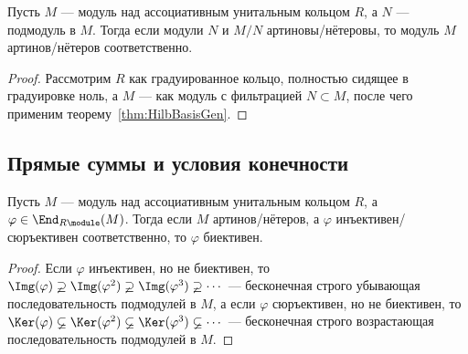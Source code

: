 \documentclass[
	extrafontsizes,
	11pt,
	hyphens,
]{memoir}
\begin{document}
\begin{theorem}
Пусть \(M\) --- модуль над ассоциативным унитальным кольцом \(R\), а \(N\) --- подмодуль в \(M\).
Тогда если модули \(N\) и \(M/N\) артиновы/нётеровы, то модуль \(M\) артинов/нётеров соответственно.
\end{theorem}

\begin{proof}
Рассмотрим \(R\) как градуированное кольцо, полностью сидящее в градуировке ноль, а \(M\) --- как модуль с фильтрацией \(N \subset M\), после чего применим теорему~\ref{thm:HilbBasisGen}.
\end{proof}

\subsection{Прямые суммы и условия конечности}

\begin{theorem}
Пусть \(M\) --- модуль над ассоциативным унитальным кольцом \(R\), а \(\varphi \in \End_{R\module}(M)\).%
\label{thm:NoetherArtinEnd}
Тогда если \(M\) артинов/нётеров, а \(\varphi\) инъективен/сюръективен соответственно, то \(\varphi\) биективен.
\end{theorem}

\begin{proof}
Если \(\varphi\) инъективен, но не биективен, то \(\Img(\varphi) \varsupsetneq \Img(\varphi^2) \varsupsetneq \Img(\varphi^3) \varsupsetneq \cdots{}\) --- бесконечная строго убывающая последовательность подмодулей в \(M\),
а если \(\varphi\) сюръективен, но не биективен, то \(\Ker(\varphi) \varsubsetneq \Ker(\varphi^2) \varsubsetneq \Ker(\varphi^3) \varsubsetneq \cdots{}\) --- бесконечная строго возрастающая последовательность подмодулей в \(M\).
\end{proof}

%
\end{document}
